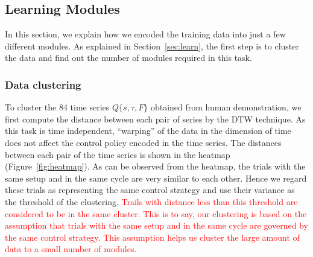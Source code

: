 






\subsection{Learning Modules}
\label{learning}

In this section, we explain how we encoded the training data into just
a few different modules. As explained in Section~\ref{sec:learn}, the
first step is to cluster the data and find out the number of modules
required in this task.

\subsubsection{Data clustering}
To cluster the 84 time series $Q\{s,\tau,F\}$ obtained from human
demonstration, we first compute the distance between each pair of
series by the DTW technique. As this task is time independent,
``warping'' of the data in the dimension of time does not affect the
control policy encoded in the time series. The distances between each
pair of the time series is shown in the heatmap
(Figure~\ref{fig:heatmap}). As can be observed from the heatmap, the
trials with the same setup and in the same cycle are very similar to
each other. Hence we regard these trials as representing the same control
strategy and use their variance as the threshold of the
clustering. \textcolor{red}{Trails with distance less than this
  threshold are considered to be in the same cluster. This is to say,
  our clustering is based on the assumption that trials with the same
  setup and in the same cycle are governed by the same control
  strategy. This assumption helps us cluster the large amount of data
  to a small number of modules.} 

